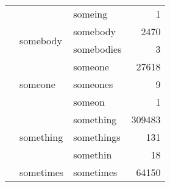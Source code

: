 \begin{longtable}[ht]{lllr}
 &  & someing & {\cellcolor[HTML]{FFFFD9}} \color[HTML]{000000} 1 \\
\cline{2-4}
 & \multirow[c]{2}{*}{somebody} & somebody & {\cellcolor[HTML]{FFFFD9}} \color[HTML]{000000} 2470 \\
 &  & somebodies & {\cellcolor[HTML]{FFFFD9}} \color[HTML]{000000} 3 \\
\cline{2-4}
 & \multirow[c]{3}{*}{someone} & someone & {\cellcolor[HTML]{FDFED5}} \color[HTML]{000000} 27618 \\
 &  & someones & {\cellcolor[HTML]{FFFFD9}} \color[HTML]{000000} 9 \\
 &  & someon & {\cellcolor[HTML]{FFFFD9}} \color[HTML]{000000} 1 \\
\cline{2-4}
 & \multirow[c]{3}{*}{something} & something & {\cellcolor[HTML]{E5F5B2}} \color[HTML]{000000} 309483 \\
 &  & somethings & {\cellcolor[HTML]{FFFFD9}} \color[HTML]{000000} 131 \\
 &  & somethin & {\cellcolor[HTML]{FFFFD9}} \color[HTML]{000000} 18 \\
\cline{2-4}
 & sometimes & sometimes & {\cellcolor[HTML]{FAFDCF}} \color[HTML]{000000} 64150 \\
\cline{1-4} \cline{2-4}
\end{longtable}
